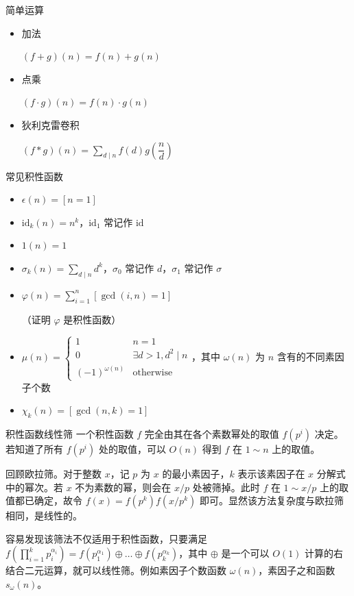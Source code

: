 \documentclass [hyperref={bookmarksdepth=4}, aspectratio=169] {beamer}
\theoremstyle {fy}
\begin{document}
\begin{frame}{简单运算}
\begin{itemize}
    \item 加法

  $(f+g)(n)=f(n)+g(n)$

    \item 点乘

  $(f\cdot g)(n)=f(n)\cdot g(n)$

    \item 狄利克雷卷积

  $(f*g)(n)=\sum\limits_{d\mid n}f(d)g(\dfrac{n}{d})$
\end{itemize}
\end{frame}

\begin{frame}{常见积性函数}
\begin{itemize}
    \item $\epsilon(n)=[n=1]$

    \item $\text{id}_k(n)=n^k$，$\text{id}_1$ 常记作 $\text{id}$

    \item $1(n)=1$

    \item $\sigma_k(n)=\sum\limits_{d\mid n}d^k$，$\sigma_0$ 常记作 $d$，$\sigma_1$ 常记作 $\sigma$

    \item $\varphi(n)=\sum\limits_{i=1}^n[\gcd(i,n)=1]$

  （证明 $\varphi$ 是积性函数）

    \item $\mu(n)=\begin{cases}1 &n=1\\0 &\exists d>1,d^2\mid n\\(-1)^{\omega(n)} &\text{otherwise} \end{cases}$，其中 $\omega(n)$ 为 $n$ 含有的不同素因子个数

    \item $\chi_k(n)=[\gcd(n,k)=1]$
\end{itemize}
\end{frame}

\begin{frame}{积性函数线性筛}
一个积性函数 $f$ 完全由其在各个素数幂处的取值 $f(p^i)$ 决定。若知道了所有 $f(p^i)$ 处的取值，可以 $O(n)$ 得到 $f$ 在 $1\sim n$ 上的取值。

回顾欧拉筛。对于整数 $x$，记 $p$ 为 $x$ 的最小素因子，$k$ 表示该素因子在 $x$ 分解式中的幂次。若 $x$ 不为素数的幂，则会在 $x/p$ 处被筛掉。此时 $f$ 在 $1\sim x/p$ 上的取值都已确定，故令 $f(x)=f(p^k)f(x/p^k)$ 即可。显然该方法复杂度与欧拉筛相同，是线性的。

容易发现该筛法不仅适用于积性函数，只要满足 $f(\prod\limits_{i=1}^k p_i^{\alpha_i})=f(p_1^{\alpha_1})\oplus\dots\oplus f(p_k^{\alpha_k})$，其中 $\oplus$ 是一个可以 $O(1)$ 计算的右结合二元运算，就可以线性筛。例如素因子个数函数 $\omega(n)$，素因子之和函数 $s_{\omega}(n)$。
\end{frame}
\end{document}
